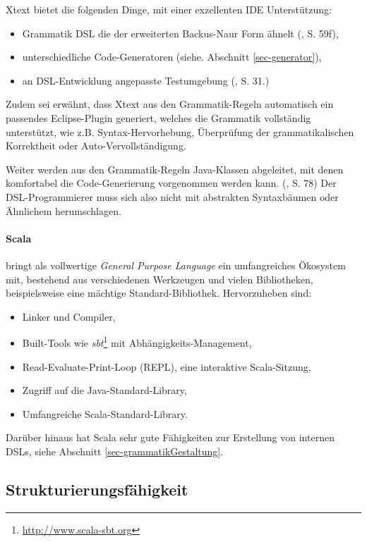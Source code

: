 Xtext bietet die folgenden Dinge, mit einer exzellenten IDE Unterstützung:

\begin{itemize}
  \item Grammatik DSL die der erweiterten Backus-Naur Form ähnelt
        (\cite{xtext}, S. 59f),
  \item unterschiedliche Code-Generatoren (siehe. Abschnitt \ref{sec-generator}),
  \item an DSL-Entwicklung angepasste Testumgebung (\cite{xtext}, S. 31.)
\end{itemize}

Zudem sei erwähnt, dass Xtext aus den Grammatik-Regeln automatisch ein
passendes Eclipse-Plugin generiert, welches die Grammatik vollständig
unterstützt, wie z.B. Syntax-Hervorhebung, Überprüfung der grammatikalischen
Korrektheit oder Auto-Vervollständigung.

Weiter werden aus den Grammatik-Regeln Java-Klassen abgeleitet, mit denen
komfortabel die Code-Generierung vorgenommen werden kann. (\cite{xtext}, S. 78)
Der DSL-Programmierer
muss sich also nicht mit abstrakten Syntaxbäumen oder Ähnlichem herumschlagen.

\paragraph{Scala} bringt als vollwertige \emph{General Purpose Language}
ein umfangreiches Ökosystem mit, bestehend aus verschiedenen Werkzeugen
und vielen Bibliotheken, beispielsweise eine mächtige Standard-Bibliothek.
Hervorzuheben sind:

\begin{itemize}
  \item Linker und Compiler,
  \item Built-Tools wie \emph{sbt}\footnote{\url{http://www.scala-sbt.org}}
        mit Abhängigkeits-Management,
  \item Read-Evaluate-Print-Loop (REPL), eine interaktive Scala-Sitzung,
  \item Zugriff auf die Java-Standard-Library,
  \item Umfangreiche Scala-Standard-Library.
\end{itemize}

Darüber hinaus hat Scala sehr gute Fähigkeiten zur Erstellung von internen
DSLs, siehe Abschnitt \ref{sec-grammatikGestaltung}.


\subsection{Strukturierungsfähigkeit}\label{sec-strukturierungsfaehigkeit}

